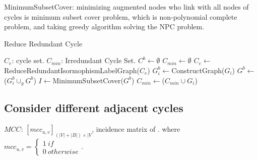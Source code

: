 MinimumSubsetCover: minimizing augmented nodes who link with all nodes of cycles is minimum subset cover problem, which is non-polynomial complete problem, and taking greedy algorithm solving the NPC problem\cite{cormen2009introduction}.
\begin{algorithm}
\caption{Reduce Redundant Cycle}
\label{alg:ReduceRedundantCycle}
\begin{algorithmic}[1]
\REQUIRE $C_e$: cycle set.
\ENSURE $C_{min}$: Irredundant Cycle Set.
\STATE $C^{b}\leftarrow \emptyset$
\STATE $C_{min}\leftarrow \emptyset$
\STATE $C_e\leftarrow$ReduceRedundantIsormophismLabelGraph($C_e$)
\STATE $G_i^b\leftarrow$ConstructGraph($G_i$)
\STATE $G^b\leftarrow$($G_i^b \cup_g G^b$)
\ENDFOR
\STATE $I\leftarrow$MinimumSubsetCover($G^b$)
\STATE $C_{min}\leftarrow$($C_{min} \cup G_i$)
\ENDIF
\ENDFOR
\end{algorithmic}
\end{algorithm}
\subsection{Consider different adjacent cycles}
$MCC$: $[mcc_{u,v}]_{(|V|+|B|)\times |V}$, incidence matrix of  . where
${mcc_{u,v}}=\left\{ \begin{array}{l}1\ if \\
0\ otherwise
\end{array} \right.$.
